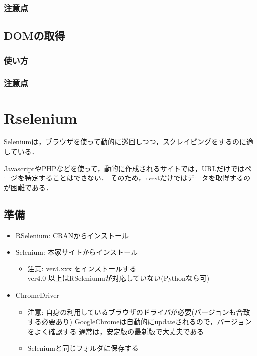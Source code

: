 \documentclass[
]{article}
\providecommand{\tightlist}{%
  \setlength{\itemsep}{0pt}\setlength{\parskip}{0pt}}
\begin{document}
\hypertarget{ux6ce8ux610fux70b9-3}{%
\subsubsection{注意点}\label{ux6ce8ux610fux70b9-3}}

\hypertarget{domux306eux53d6ux5f97}{%
\subsection{DOMの取得}\label{domux306eux53d6ux5f97}}

\hypertarget{ux4f7fux3044ux65b9-4}{%
\subsubsection{使い方}\label{ux4f7fux3044ux65b9-4}}

\hypertarget{ux6ce8ux610fux70b9-4}{%
\subsubsection{注意点}\label{ux6ce8ux610fux70b9-4}}

\hypertarget{rselenium}{%
\section{Rselenium}\label{rselenium}}

Seleniumは，ブラウザを使って動的に巡回しつつ，スクレイピングをするのに適している．

JavascriptやPHPなどを使って，動的に作成されるサイトでは，URLだけではページを特定することはできない．
そのため，rvestだけではデータを取得するのが困難である．

\hypertarget{ux6e96ux5099-3}{%
\subsection{準備}\label{ux6e96ux5099-3}}

\begin{itemize}
\tightlist
\item
  RSelenium: CRANからインストール\\
\item
  Selenium: 本家サイトからインストール

  \begin{itemize}
  \tightlist
  \item
    注意: ver3.xxx をインストールする\\
    ver4.0 以上はRSeleniumuが対応していない(Pythonなら可)\\
  \end{itemize}
\item
  ChromeDriver

  \begin{itemize}
  \tightlist
  \item
    注意: 自身の利用しているブラウザのドライバが必要(バージョンも合致する必要あり)
    GoogleChromeは自動的にupdateされるので，バージョンをよく確認する
    通常は，安定版の最新版で大丈夫である
  \item
    Seleniumと同じフォルダに保存する
  \end{itemize}
\end{itemize}
\end{document}
